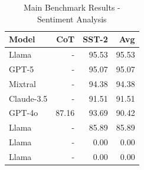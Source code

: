 

\begin{table}[htbp]
\centering
\caption{Main Benchmark Results - Sentiment Analysis}
\label{tab:sa_main_results}
\begin{tabular}{lrrr}
\toprule
Model & CoT & SST-2 & \textbf{Avg} \\
\midrule
Llama & - & 95.53 & 95.53 \\
GPT-5 & - & 95.07 & 95.07 \\
Mixtral & - & 94.38 & 94.38 \\
Claude-3.5 & - & 91.51 & 91.51 \\
GPT-4o & 87.16 & 93.69 & 90.42 \\
Llama & - & 85.89 & 85.89 \\
Llama & - & 0.00 & 0.00 \\
Llama & - & 0.00 & 0.00 \\
\bottomrule
\end{tabular}
\end{table}


